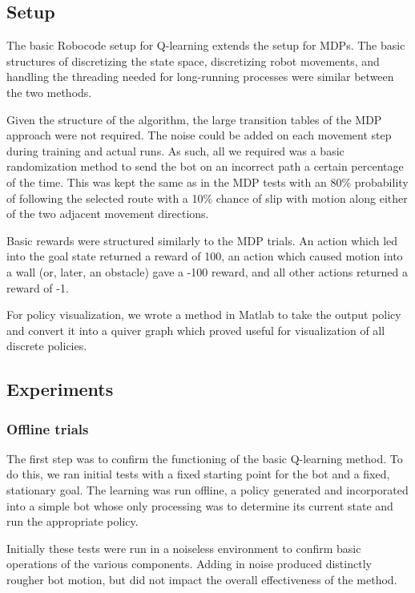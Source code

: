 \documentclass{aiaa-tc}%
\begin{document}
\subsection{Setup}

The basic Robocode setup for Q-learning extends
the setup for MDPs. The basic structures of discretizing the state
space, discretizing robot movements, and handling the threading needed
for long-running processes were similar between the two methods.

Given the structure of the algorithm, the large transition tables of
the MDP approach were not required. The noise could be added on each movement
step during training and actual runs. As such, all we required was a
basic randomization method to send the bot on an incorrect path a
certain percentage of the time. This was kept the same as in the MDP
tests with an 80\% probability of following the selected route with a
10\% chance of slip with motion along either of the two adjacent
movement directions.

Basic rewards were structured similarly to the MDP trials. An action
which led into the goal state returned a reward of 100, an action
which caused motion into a
wall (or, later, an obstacle) gave a -100 reward, and all other
actions returned a reward of -1.

For policy visualization, we wrote a method in Matlab to take the output
policy and convert it into a quiver graph which proved useful for
visualization of all discrete policies.

\subsection{Experiments}

\subsubsection{Offline trials}
The first step was to confirm the functioning of the basic
Q-learning method. To do this, we ran initial tests with a fixed
starting point for the bot and a fixed, stationary
goal. The learning was run offline, a policy generated and
incorporated into a simple bot whose only processing was to determine
its current state and run the appropriate policy.

Initially these tests were run in a noiseless environment to
confirm basic operations of the various components. Adding in noise
produced distinctly rougher bot motion, but did not impact the overall
effectiveness of the method.
\end{document}
